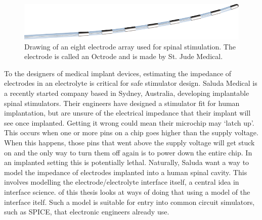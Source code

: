   \begin{figure}
    \begin{center}
      \includegraphics{content/introduction/graphics/StJudeOctrode}
    \end{center}
    \caption{Drawing of an eight electrode array used for spinal stimulation. The electrode is called an Octrode and is made by St. Jude Medical.}
    \label{fig:octrode}
  \end{figure}

  To the designers of medical implant devices, estimating the impedance of electrodes in an electrolyte is critical for safe stimulator design.
  Saluda Medical is a recently started company based in Sydney, Australia, developing implantable spinal stimulators.
  Their engineers have designed a stimulator fit for human implantation, but are unsure of the electrical impedance that their implant will see once implanted.
  Getting it wrong could mean their microchip may `latch up'.
  This occurs when one or more pins on a chip goes higher than the supply voltage.
  When this happens, those pins that went above the supply voltage will get stuck on and the only way to turn them off again is to power down the entire chip.
  In an implanted setting this is potentially lethal.
  Naturally, Saluda want a way to model the impedance of electrodes implanted into a human spinal cavity.
  This involves modelling the electrode/electrolyte interface itself, a central idea in interface science.
   of this thesis looks at ways of doing that using a model of the interface itelf.
  Such a model is suitable for entry into common circuit simulators, such as SPICE, that electronic engineers already use.

